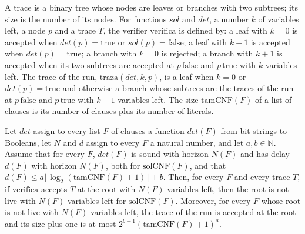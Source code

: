 \begin{definition}
  \label{def:search-traza}
  \leanok
  A trace is a binary tree whose nodes are leaves or branches with two subtrees; its size is the
  number of its nodes. For functions $\mathit{sol}$ and $\mathit{det}$, a number $k$ of variables
  left, a node $p$ and a trace $T$, the verifier $\mathrm{verifica}$ is defined by: a leaf with
  $k = 0$ is accepted when $\mathit{det}(p) = \mathrm{true}$ or $\mathit{sol}(p) = \mathrm{false}$;
  a leaf with $k + 1$ is accepted when $\mathit{det}(p) = \mathrm{true}$; a branch with $k = 0$ is
  rejected; a branch with $k + 1$ is accepted when its two subtrees are accepted at
  $p\,\mathrm{false}$ and $p\,\mathrm{true}$ with $k$ variables left. The trace of the run,
  $\mathrm{traza}(\mathit{det}, k, p)$, is a leaf when $k = 0$ or $\mathit{det}(p) = \mathrm{true}$
  and otherwise a branch whose subtrees are the traces of the run at $p\,\mathrm{false}$ and
  $p\,\mathrm{true}$ with $k - 1$ variables left. The size $\mathrm{tamCNF}(F)$ of a list of clauses
  is its number of clauses plus its number of literals.
  \own{}
\end{definition}

\begin{theorem}
  \label{thm:search-refutaciones-uniformes}
  \leanok
  Let $\mathit{det}$ assign to every list $F$ of clauses a function $\mathit{det}(F)$ from bit strings
  to Booleans, let $N$ and $d$ assign to every $F$ a natural number, and let $a, b \in \mathbb{N}$.
  Assume that for every $F$, $\mathit{det}(F)$ is sound with horizon $N(F)$ and has delay $d(F)$ with
  horizon $N(F)$, both for $\mathrm{solCNF}(F)$, and that $d(F) \le a \lfloor \log_2 (\mathrm{tamCNF}(F) + 1)
  \rfloor + b$. Then, for every $F$ and every trace $T$, if $\mathrm{verifica}$ accepts $T$ at the
  root with $N(F)$ variables left, then the root is not live with $N(F)$ variables left for
  $\mathrm{solCNF}(F)$. Moreover, for every $F$ whose root is not live with $N(F)$ variables left, the
  trace of the run is accepted at the root and its size plus one is at most
  $2^{b+1}(\mathrm{tamCNF}(F) + 1)^a$.
  \own{}
\end{theorem}

